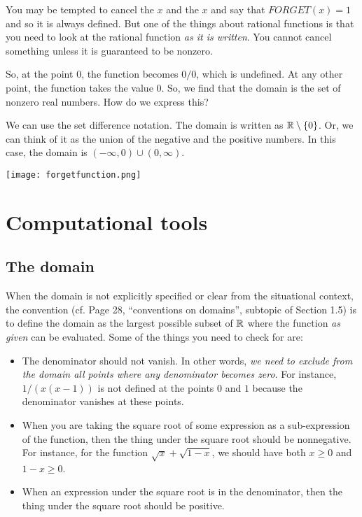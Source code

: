 \documentclass{amsart}
\begin{document}
You may be tempted to cancel the $x$ and the $x$ and say that
$FORGET(x) = 1$ and so it is always defined. But one of the things
about rational functions is that you need to look at the rational
function {\em as it is written}. You cannot cancel something unless it
is guaranteed to be nonzero.

So, at the point $0$, the function becomes $0/0$, which is
undefined. At any other point, the function takes the value $0$. So,
we find that the domain is the set of nonzero real numbers. How do we
express this?

We can use the set difference notation. The domain is written as
$\mathbb{R} \setminus \{ 0 \}$. Or, we can think of it as the union of the
negative and the positive numbers. In this case, the domain is
$(-\infty,0) \cup (0,\infty)$. 

\texttt{[image: forgetfunction.png]}

\section{Computational tools}

\subsection{The domain}

When the domain is not explicitly specified or clear from the
situational context, the convention (cf. Page 28, ``conventions on
domains'', subtopic of Section 1.5) is to define the domain as the
largest possible subset of $\mathbb{R}$ where the function {\em as given} can
be evaluated. Some of the things you need to check for are:

\begin{itemize}
\item The denominator should not vanish. In other words, {\em we need
  to exclude from the domain all points where any denominator becomes
  zero}. For instance, $1/(x(x-1))$ is not defined at the points $0$
  and $1$ because the denominator vanishes at these points.
\item When you are taking the square root of some expression as a
  sub-expression of the function, then the thing under the square root
  should be nonnegative. For instance, for the function $\sqrt{x} +
  \sqrt{1-x}$, we should have both $x \ge 0$ and $1 - x \ge 0$.
\item When an expression under the square root is in the denominator,
  then the thing under the square root should be positive.
\end{itemize}
\end{document}
